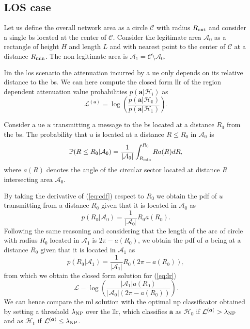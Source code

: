 \documentclass[twocolumns]{IEEEtran}
\begin{document}
\subsection{LOS case}

Let us define the overall network area as a circle $\mathcal{C}$ with radius $R_{\rm out}$ and consider a single \ac{bs} located at the center of $\mathcal{C}$. Consider the legitimate area $\mathcal{A}_{0}$ as a rectangle of height $H$ and length $L$ and with nearest point to the center of $\mathcal{C}$ at a distance $R_{\rm min}$. The non-legitimate area is $\mathcal{A}_1 = \mathcal{C} \setminus \mathcal{A}_0$.

Iin the \ac{los} scenario the attenuation incurred by a \ac{ue} only depends on its relative distance to the \ac{bs}. We can here compute the closed form \ac{llr} of the region dependent attenuation value probabilities $p(\bm{a}|\mathcal{H}_i)$ as
\begin{equation}\label{eq:lr}
    \mathcal{L}^{(\bm{a})}=\log\left(\frac{p(\bm{a}|\mathcal{H}_0)}{p(\bm{a}|\mathcal{H}_1)}\right).
\end{equation}

Consider a \ac{ue} $u$ transmitting a message to the \ac{bs} located at a distance $R_0$ from the \ac{bs}. The probability that $u$ is located at a distance $R\le R_0$ in $\mathcal{A}_0$ is
\begin{equation}\label{eq:cdf}
     \mathbb{P}(R \le R_0|\mathcal{A}_0) = \frac{1}{|\mathcal{A}_0|}\int_{R_{\rm min}}^{R_0} R a(R) dR,
\end{equation}
where $a(R)$ denotes the angle of the circular sector located at distance $R$ intersecting area $\mathcal{A}_0$.

By taking the derivative of (\ref{eq:cdf}) respect to $R_0$ we obtain the \ac{pdf} of $u$ transmitting from a distance $R_0$ given that it is located in $\mathcal{A}_0$ as
\begin{equation}
    p(R_0|\mathcal{A}_0) = \frac{1}{|\mathcal{A}_0|}R_0a(R_0).
\end{equation}
Following the same reasoning and considering that the length of the arc of circle with radius $R_0$ located in $\mathcal{A}_1$ is $2\pi - a(R_0)$, we obtain the \ac{pdf} of $u$ being at a distance $R_0$ given that it is located in $\mathcal{A}_1$ as
\begin{equation}
     p(R_0|\mathcal{A}_1) = \frac{1}{|\mathcal{A}_1|}R_0\left(2\pi-a(R_0)\right),
\end{equation}
from which we obtain the closed form solution for (\ref{eq:lr}) 
\begin{equation}
    \mathcal{L}=\log\left(\frac{|\mathcal{A}_1|a(R_0)}{|\mathcal{A}_0|\left(2\pi-a(R_0)\right)}\right).
\end{equation}
We can hence compare the \ac{ml} solution with the optimal \ac{np} classificator obtained by setting a threshold $\lambda_{\rm NP}$ over the \ac{llr}, which classifies $\bm{a}$ as $\mathcal{H}_0$ if $\mathcal{L}^{(\bm{a})} > \lambda_{\rm NP}$ and as $\mathcal{H}_1$ if $\mathcal{L}^{(\bm{a})} \le \lambda_{\rm NP}$.
\end{document}
